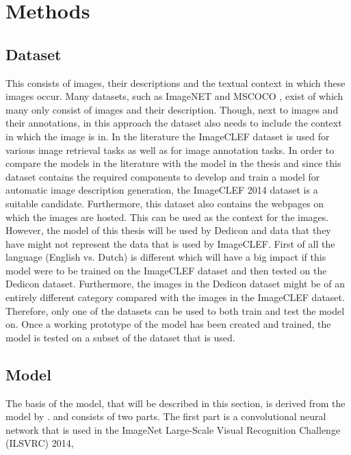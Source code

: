 \section{Methods}

\subsection{Dataset}
This consists of images, their descriptions and the textual context in which these images occur. Many datasets, such as ImageNET \cite{Russakovsky2012} and MSCOCO \cite{Lin2014}, exist of which many only consist of images and their description. Though, next to images and their annotations, in this approach the dataset also needs to include the context in which the image is in. In the literature the ImageCLEF dataset is used for various image retrieval tasks as well as for image annotation tasks. In order to compare the models in the literature with the model in the thesis and since this dataset contains the required components to develop and train a model for automatic image description generation, the ImageCLEF 2014 dataset is a suitable candidate. Furthermore, this dataset also contains the webpages on which the images are hosted. This can be used as the context for the images. However, the model of this thesis will be used by Dedicon and data that they have might not represent the data that is used by ImageCLEF. First of all the language (English vs. Dutch) is different which will have a big impact if this model were to be trained on the ImageCLEF dataset and then tested on the Dedicon dataset. Furthermore, the images in the Dedicon dataset might be of an entirely different category compared with the images in the ImageCLEF dataset. Therefore, only one of the datasets can be used to both train and test the model on. Once a working prototype of the model has been created and trained, the model is tested on a subset of the dataset that is used. 

\subsection{Model}
The basis of the model, that will be described in this section, is derived from the model by \citeauthor{karpathyfeifei2014deep}. \cite{karpathyfeifei2014deep} and consists of two parts. The first part is a convolutional neural network \cite{simonyan2014very} that is used in the ImageNet Large-Scale Visual Recognition Challenge (ILSVRC) 2014,